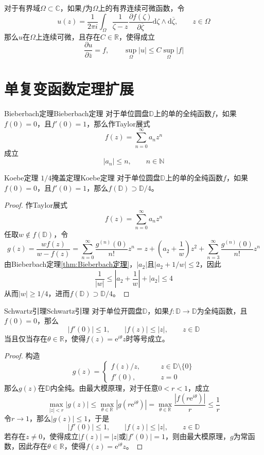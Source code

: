 \documentclass[lang = cn, scheme = chinese, thmcnt = section]{elegantbook}
\newcommand{\N}{\mathbb{N}}            %
\newcommand{\R}{\mathbb{R}}            %
\newcommand{\C}{\mathbb{C}}  		   %
\newcommand{\sub}{\subset}             %
\newcommand{\dd}{\mathrm{d}}           %
\begin{document}
\begin{theorem}
	对于有界域$\Omega\sub\C$，如果$f$为$\Omega$上的有界连续可微函数，令%
	$$
	u(z)=\frac{1}{2\pi i}\int_{\Omega}\frac{1}{\zeta-z}\frac{\partial f(\zeta)}{\partial \overline{\zeta}}\dd\zeta\wedge\dd\overline{\zeta},\qquad z\in\Omega
	$$
	那么$u$在$\Omega$上连续可微，且存在$C\in\R$，使得成立%
	$$
	\frac{\partial u}{\partial \overline{z}}=f,\qquad 
	\sup_{\Omega}|u|\le C\sup_{\Omega}|f|
	$$
\end{theorem}

\appendix

\chapter{单复变函数定理扩展}

\begin{theorem}{Bieberbach定理}{Bieberbach定理}
	对于单位圆盘$\mathbb{D}$上的单的全纯函数$f$，如果$f(0)=0$，且$f'(0)=1$，那么作Taylor展式%
	$$
	f(z)=\sum_{n=0}^{\infty}a_nz^n
	$$
	成立%
	$$
	|a_n|\le n,\qquad n\in\N
	$$
\end{theorem}

\begin{theorem}{Koebe定理 $1/4$掩盖定理}{Koebe定理}
	对于单位圆盘$\mathbb{D}$上的单的全纯函数$f$，如果$f(0)=0$，且$f'(0)=1$，那么$f(\mathbb{D})\supset\mathbb{D}/4$。
\end{theorem}

\begin{proof}
	作Taylor展式%
	$$
	f(z)=\sum_{n=0}^{\infty}a_nz^n
	$$
	任取$w\notin f(\mathbb{D})$，令%
	$$
	g(z)
	=\frac{wf(z)}{w-f(z)}
	=\sum_{n=0}^{\infty}\frac{g^{(n)}(0)}{n!}z^n
	=z+\left(a_2+\frac{1}{w}\right)z^2+\sum_{n=3}^{\infty}\frac{g^{(n)}(0)}{n!}z^n
	$$
	由Bieberbach定理\ref{thm:Bieberbach定理}，$|a_2|$且$|a_2+1/w|\le 2$，因此%
	$$
	\frac{1}{|w|}
	\le\left|a_2+\frac{1}{w}\right|+|a_2|
	\le 4
	$$
	从而$|w|\ge 1/4$，进而$f(\mathbb{D})\supset\mathbb{D}/4$。
\end{proof}

\begin{lemma}{Schwartz引理}{Schwartz引理}
	对于单位开圆盘$\mathbb{D}$，如果$f:\mathbb{D}\to\mathbb{D}$为全纯函数，且$f(0)=0$，那么
	$$
	|f'(0)|\le 1,\qquad 
	|f(z)|\le|z|,\qquad
	z\in\mathbb{D}
	$$
	当且仅当存在$\theta\in\R$，使得$f(z)=\mathrm{e}^{i\theta}z$时等号成立。
\end{lemma}

\begin{proof}
	构造%
	$$
	g(z)=\begin{cases}
		f(z)/z,\qquad & z\in\mathbb{D}\setminus\{0\}\\
		f'(0),\qquad & z=0
	\end{cases}
	$$
	那么$g(z)$在$\mathbb{D}$内全纯。由最大模原理，对于任意$0<r<1$，成立
	$$
	\max_{|z|<r}|g(z)|\le \max_{\theta\in\R}|g(r\mathrm{e}^{i\theta})|
	=\max_{\theta\in\R}\frac{|f(r\mathrm{e}^{i\theta})|}{r}\le\frac{1}{r}
	$$
	令$r\to 1$，那么$|g(z)|\le 1$，于是
	$$
	|f'(0)|\le 1,\qquad 
	|f(z)|\le|z|,\qquad
	z\in\mathbb{D}
	$$
	若存在$z\ne 0$，使得成立$|f(z)|=|z|$或$|f'(0)|=1$，则由最大模原理，$g$为常函数，因此存在$\theta\in\R$，使得$f(z)=\mathrm{e}^{i\theta}z$。
\end{proof}
\end{document}
